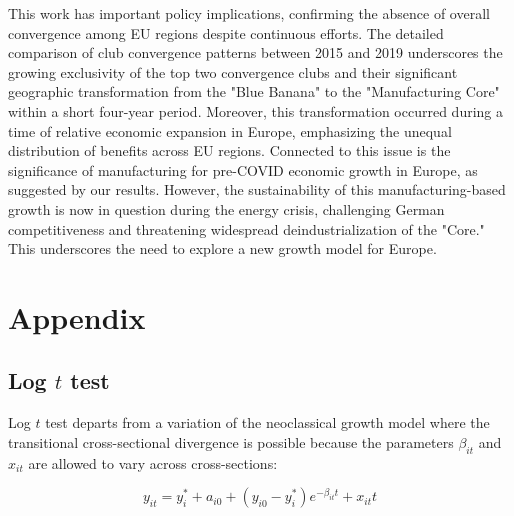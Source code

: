 \documentclass[11pt]{article}
\begin{document}
This work has important policy implications, confirming the absence of overall convergence among EU regions despite continuous efforts. The detailed comparison of club convergence patterns between 2015 and 2019 underscores the growing exclusivity of the top two convergence clubs and their significant geographic transformation from the "Blue Banana" to the "Manufacturing Core" within a short four-year period. Moreover, this transformation occurred during a time of relative economic expansion in Europe, emphasizing the unequal distribution of benefits across EU regions. Connected to this issue is the significance of manufacturing for pre-COVID economic growth in Europe, as suggested by our results. However, the sustainability of this manufacturing-based growth is now in question during the energy crisis, challenging German competitiveness and threatening widespread deindustrialization of the "Core." This underscores the need to explore a new growth model for Europe.








\newpage


\appendix
\section{Appendix}
\setcounter{table}{0}
\renewcommand{\thetable}{A\arabic{table}}
\renewcommand{\thefigure}{A\arabic{figure}}
\setcounter{figure}{0}


\subsection{Log $t$ test}

Log $t$ test departs from a variation of the neoclassical growth model where the transitional cross-sectional divergence is possible because the parameters $\beta_{it}$ and $x_{it}$ are allowed to vary across cross-sections:

\begin{equation} \label{eq3}
 y_{it} = y_i^* + a_{i0} + (y_{i0} - y_i^*)e^{-\beta_{it}t} + x_{it}t 
\end{equation}
\end{document}
